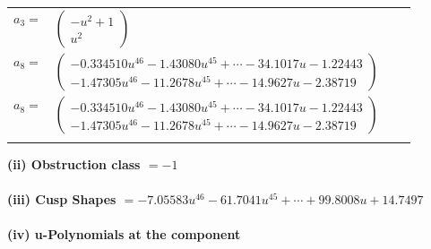 \documentclass[1p]{elsarticle_modified}
\theoremstyle{definition}
\begin{document}
\begin{tabular}{m{7pt} m{180pt} m{7pt} m{180pt} }
\flushright $a_{3}=$&$\begin{pmatrix}- u^2+1\\u^2\end{pmatrix}$ \\
\flushright $a_{8}=$&$\begin{pmatrix}-0.334510 u^{46}-1.43080 u^{45}+\cdots-34.1017 u-1.22443\\-1.47305 u^{46}-11.2678 u^{45}+\cdots-14.9627 u-2.38719\end{pmatrix}$\\ \flushright $a_{8}=$&$\begin{pmatrix}-0.334510 u^{46}-1.43080 u^{45}+\cdots-34.1017 u-1.22443\\-1.47305 u^{46}-11.2678 u^{45}+\cdots-14.9627 u-2.38719\end{pmatrix}$\\&\end{tabular}
\flushleft \textbf{(ii) Obstruction class $= -1$}\\~\\
\flushleft \textbf{(iii) Cusp Shapes $= -7.05583 u^{46}-61.7041 u^{45}+\cdots+99.8008 u+14.7497$}\\~\\
\newpage\renewcommand{\arraystretch}{1}
\flushleft \textbf{(iv) u-Polynomials at the component}\newline \\
\end{document}
